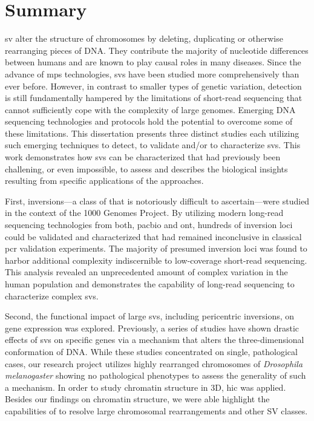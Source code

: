 \cleardoublepage
{}
\chapter*{Summary}

\Acf{sv} alter the structure of chromosomes by deleting, duplicating or
otherwise rearranging pieces of DNA. They contribute the majority of nucleotide
differences between humans and are known to play causal roles in many diseases.
Since the advance of \acf{mps} technologies, \acp{sv} have been
studied more comprehensively than ever before. However, in contrast to smaller
types of genetic variation, \sv detection is still fundamentally hampered by
the limitations of short-read sequencing that cannot sufficiently cope with the
complexity of large genomes. Emerging DNA sequencing technologies and protocols
hold the potential to overcome some of these limitations. This dissertation
presents three distinct studies each utilizing such emerging techniques to
detect, to validate and/or to characterize \acp{sv}. This work demonstrates
how \acp{sv} can be characterized that had previously been
challening, or even impossible, to assess and describes the biological insights
resulting from specific applications of the approaches.

First, inversions---a class of \sv that is notoriously difficult to
ascertain---were studied in the context of the 1000 Genomes Project. By utilizing
modern long-read sequencing technologies from both, \acl{pacbio} and \acl{ont},
hundreds of inversion loci could be validated and characterized that had remained
inconclusive in classical \acs{pcr} validation experiments. The majority of presumed
inversion loci was found to harbor additional complexity indiscernible to
low-coverage short-read sequencing. This analysis revealed an unprecedented amount of
complex variation in the human population and demonstrates the capability of
long-read sequencing to characterize complex \acp{sv}.

Second, the functional impact of large \acp{sv}, including
pericentric inversions, on gene expression was explored. Previously, a series of
studies have shown drastic effects of \acp{sv} on specific genes via a mechanism that alters
the three-dimensional conformation of DNA. While these studies concentrated on
single, pathological cases, our research project utilizes highly rearranged
chromosomes of \textit{Drosophila melanogaster} showing no pathological
phenotypes to assess the generality of such a mechanism. In order to study
chromatin structure in 3D, \acf{hic} was applied. Besides our findings on
chromatin structure, we were able highlight the capabilities of \hic to resolve
large chromosomal rearrangements and other SV classes.

